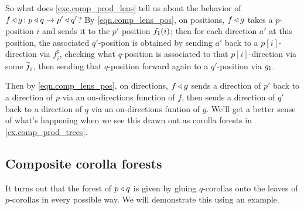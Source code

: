 \documentclass[Book-Poly]{subfiles}
\begin{document}
So what does \cref{exc.comp_prod_lens} tell us about the behavior of $f\mathbin{\triangleleft} g\colon p\mathbin{\triangleleft} q\to p'\mathbin{\triangleleft} q'$?
By \eqref{eqn.comp_lens_pos}, on positions, $f\mathbin{\triangleleft} g$ takes a $p$-position $i$ and sends it to the $p'$-position $f_{\textsf{1}}(i)$; then for each direction $a'$ at this position, the associated $q'$-position is obtained by sending $a'$ back to a $p[i]$-direction via $f^\sharp_i$, checking what $q$-position is associated to that $p[i]$-direction via some $\overline{j}_i$, then sending that $q$-position forward again to a $q'$-position via $g_{\textsf{1}}$.

Then by \eqref{eqn.comp_lens_pos}, on directions, $f\mathbin{\triangleleft} g$ sends a direction of $p'$ back to a direction of $p$ via an on-directions function of $f$, then sends a direction of $q'$ back to a direction of $q$ via an on-directions funtion of $g$.
We'll get a better sense of what's happening when we see this drawn out as corolla forests in \cref{ex.comp_prod_trees}.

\subsection{Composite corolla forests} \label{subsec.comon.comp.def.corolla}

It turns out that the forest of $p\mathbin{\triangleleft} q$ is given by gluing $q$-corollas onto the leaves of $p$-corollas in every possible way.
We will demonstrate this using an example.
\end{document}
